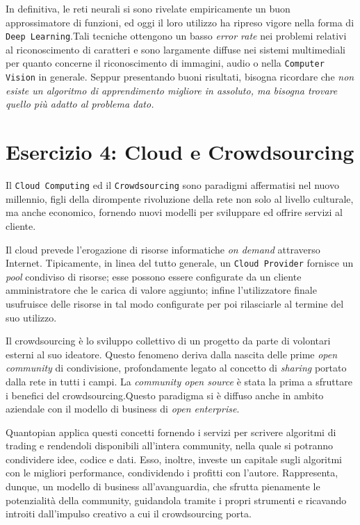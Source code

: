 {			In definitiva, le reti neurali si sono rivelate empiricamente un buon approssimatore di funzioni, ed oggi il loro utilizzo ha ripreso vigore nella forma di \texttt{Deep Learning}.Tali tecniche ottengono un basso \emph{error rate} nei problemi relativi al riconoscimento di caratteri e sono largamente diffuse nei sistemi multimediali per quanto concerne il riconoscimento di immagini, audio o nella \texttt{Computer Vision} in generale. Seppur presentando buoni risultati, bisogna ricordare che \emph{non esiste un algoritmo di apprendimento migliore in assoluto, ma bisogna trovare quello più adatto al problema dato.}
			
		\section{Esercizio 4: Cloud e Crowdsourcing}
			\label{sec:es4}
			Il \texttt{Cloud Computing} ed il \texttt{Crowdsourcing} sono paradigmi affermatisi nel nuovo millennio, figli della dirompente rivoluzione della rete non solo al livello culturale, ma anche economico, fornendo nuovi modelli per sviluppare ed offrire servizi al cliente.\par
			Il cloud prevede l'erogazione di risorse informatiche \emph{on demand} attraverso Internet. Tipicamente, in linea del tutto generale, un \texttt{Cloud Provider} fornisce un \emph{pool} condiviso di risorse; esse possono essere configurate da un cliente amministratore che le carica di valore aggiunto; infine l'utilizzatore finale usufruisce delle risorse in tal modo configurate per poi rilasciarle al termine del suo utilizzo.\par
			Il crowdsourcing è lo sviluppo collettivo di un progetto da parte di volontari esterni al suo ideatore. Questo fenomeno deriva dalla nascita delle prime \emph{open community} di condivisione, profondamente legato al concetto di \emph{sharing} portato dalla rete  in tutti i campi. La \emph{community open source} è stata la prima a sfruttare i benefici del crowdsourcing.Questo paradigma si è diffuso anche in ambito aziendale con il modello di business di \emph{open enterprise}.\par
			Quantopian applica questi concetti fornendo i servizi per scrivere algoritmi di trading e rendendoli disponibili all'intera community, nella quale si potranno condividere idee, codice e dati. Esso, inoltre, investe un capitale sugli algoritmi con le migliori performance, condividendo i profitti con l'autore. Rappresenta, dunque, un modello di business all'avanguardia, che sfrutta pienamente le potenzialità della community, guidandola tramite i propri strumenti e ricavando introiti dall'impulso creativo a cui il crowdsourcing porta.
}
